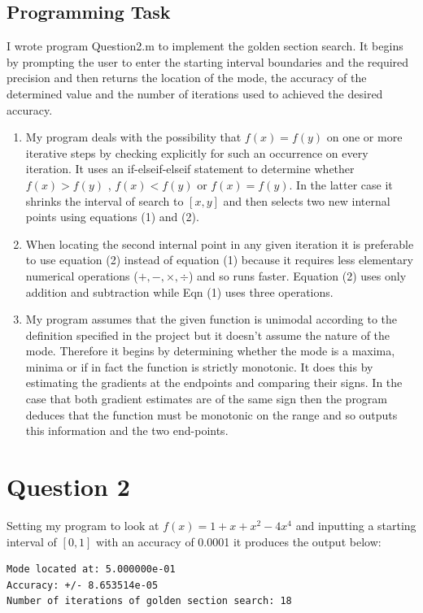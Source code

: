 \documentclass[a4paper]{article}
\begin{document}
\subsection*{Programming Task}
I wrote program Question\textunderscore2.m to implement the golden section search. It begins by prompting the user to enter the starting interval boundaries and the required precision and then returns the location of the mode, the accuracy of the determined value and the number of iterations used to achieved the desired accuracy.
\renewcommand{\labelenumi}{\roman{enumi}}
\begin{enumerate}
   \item
   		My program deals with the possibility that $f(x) = f(y)$ on one or more iterative steps by checking explicitly for such an occurrence on every iteration. It uses an if-elseif-elseif statement to determine whether $f(x)>f(y)$ , $f(x)<f(y)$ or $f(x)=f(y)$. In the latter case it shrinks the interval of search to $[x,y]$ and then selects two new internal points using equations (1) and (2).
   \item
   		When locating the second internal point in any given iteration it is preferable to use equation (2) instead of equation (1) because it requires less elementary numerical operations ($+,-,\times,\div$) and so runs faster. Equation (2) uses only addition and subtraction while Eqn (1) uses three operations.
   \item
   		My program assumes that the given function is unimodal according to the definition specified in the project but it doesn't assume the nature of the mode. Therefore it begins by determining whether the mode is a maxima, minima or if in fact the function is strictly monotonic. It does this by estimating the gradients at the endpoints and comparing their signs. In the case that both gradient estimates are of the same sign then the program deduces that the function must be monotonic on the range and so outputs this information and the two end-points.
\end{enumerate}

\pagebreak
\section*{Question 2}
Setting my program to look at $f(x) = 1+x+x^2-4x^4$ and inputting a starting interval of $[0,1]$ with an accuracy of 0.0001 it produces the output below:
\begin{verbatim}
Mode located at: 5.000000e-01 
Accuracy: +/- 8.653514e-05 
Number of iterations of golden section search: 18
\end{verbatim}
\end{document}
